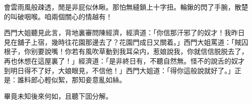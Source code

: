 \begin{myquote}
會雲雨風般疎透，閒是非屁似休瞅。那怕無縫鎖上十字扭。輪鍬的閃了手腕，散楚的叫破咽喉。咱兩個關心的情越有！
\end{myquote}

西門大姐聽見此言，背地裏審問陳經濟，經濟道：「你信那汗邪了的奴才！我昨日見在舖子上宿，幾時往花園那邊去了？花園門成日又關着。」西門大姐罵道：「賊囚根子，你别要說嘴！你若有風吹草動到我耳朵内，惹娘說我，你就信信脱脱去了，再也休想在這屋裏了！」經濟道：「是非終日有，不聽自然無。怪不的說舌的奴才到明日得不了好，大娘眼見，不信他！」西門大姐道：「得你這般說就好了。」正是：誰料郎心輕似絮，那知妾意亂如絲。

畢竟未知後來何如，且聽下囬分解。

